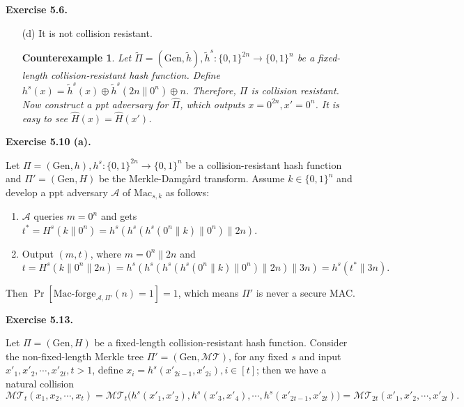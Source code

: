 \documentclass[a4paper]{article}
\newtheorem*{proof}{Proof}
\newtheorem*{counterexample}{Counterexample}
\newenvironment{exercise}[1]{
	\par
	\noindent\textbf{Exercise #1.}\quad
}{
	\par
	\bigskip
}
\newcommand{\sbra}[1]{\left[ #1 \right]}
\newcommand{\bin}{\{0,1\}}
\newcommand{\Gen}{\mathrm{Gen}}
\newcommand{\Mac}{\mathrm{Mac}}
\newcommand{\Macforge}{\mathrm{Mac}\text{-}\mathrm{forge}}
\newcommand{\ppt}{{\sc ppt} }
\newcommand{\Acal}{\mathcal{A}}
\begin{document}
\begin{exercise}{5.6}
\begin{enumerate}
\begin{proof}
\begin{itemize}
                \item $|x|=|x'|$. Then $B=B'$. If $z_{B}\|x_{B+1}\neq z'_{B}\|x'_{B+1}$, 
                    similarly we have a collision for $h$;
                    otherwise $z_{B}=z'_{B}$, then repeat this process.
                    Since $x\neq x'$, these must exists a collision for $h$.
            \end{itemize}
        \end{proof}
    \item[(d)] It is not collision resistant.
        \begin{counterexample}
            Let $\widetilde\Pi=(\Gen,\tilde h),\tilde h^s:\bin^{2n}\to\bin^{n}$ 
            be a fixed-length collision-resistant hash function.
            Define $h^s(x)=\tilde h^s(x)\oplus\tilde h^s(2n\|0^n)\oplus n$. Therefore, $\Pi$ is collision resistant.
            Now construct a \ppt adversary for $\widehat\Pi$, which outputs $x=0^{2n},x'=0^{n}$. 
            It is easy to see $\hat H(x)=\hat H(x')$.
        \end{counterexample}
\end{enumerate}
\end{exercise}

\begin{exercise}{5.10 (a)}
    Let $\Pi=(\Gen,h),h^s:\bin^{2n}\to\bin^n$ be a collision-resistant hash function 
    and $\Pi'=(\Gen,H)$ be the Merkle-Damg\aa rd transform.
    Assume $k\in\bin^n$ and develop a \ppt adversary $\Acal$ of $\Mac_{s,k}$ as follows:
    \begin{enumerate}
        \item $\Acal$ queries $m=0^n$ and gets $t^*=H^s(k\|0^n)=h^s(h^s(h^s(0^n\|k)\|0^n)\|2n)$.
        \item Output $(m,t)$, where $m=0^n\|2n$ and 
            $$t=H^s(k\|0^n\|2n)=h^s(h^s(h^s(h^s(0^n\|k)\|0^n)\|2n)\|3n)=h^s(t^*\|3n).$$
    \end{enumerate}
    Then $\Pr\sbra{\Macforge_{\Acal,\Pi'}(n)=1}=1$, which means $\Pi'$ is never a secure MAC.
\end{exercise}

\begin{exercise}{5.13}
    Let $\Pi=(\Gen,H)$ be a fixed-length collision-resistant hash function.
    Consider the non-fixed-length Merkle tree $\Pi'=(\Gen,\mathcal{MT})$, 
    for any fixed $s$ and input $x'_1,x'_2,\cdots,x'_{2t},t>1$, define $x_i=h^s(x'_{2i-1},x'_{2i}),i\in[t]$;
    then we have a natural collision
    $$
    \mathcal{MT}_t(x_1,x_2,\cdots,x_t)=
    \mathcal{MT}_t\Big(h^s(x'_1,x'_2),h^s(x'_3,x'_4),\cdots,h^s(x'_{2t-1},x'_{2t})\Big)=
    \mathcal{MT}_{2t}(x'_1,x'_2,\cdots,x'_{2t}).
    $$
\end{exercise}
\end{document}

